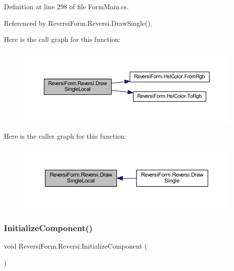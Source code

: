Definition at line 298 of file Form\+Main.\+cs.



Referenced by Reversi\+Form.\+Reversi.\+Draw\+Single().

Here is the call graph for this function\+:
\nopagebreak
\begin{figure}[H]
\begin{center}
\leavevmode
\includegraphics[width=350pt]{class_reversi_form_1_1_reversi_aaa7228857f9476b7950b0af1524abf44_cgraph}
\end{center}
\end{figure}
Here is the caller graph for this function\+:
\nopagebreak
\begin{figure}[H]
\begin{center}
\leavevmode
\includegraphics[width=350pt]{class_reversi_form_1_1_reversi_aaa7228857f9476b7950b0af1524abf44_icgraph}
\end{center}
\end{figure}
\mbox{\label{class_reversi_form_1_1_reversi_abec0816dd006d05b512d86b45a20af68}} 
\subsubsection{\texorpdfstring{Initialize\+Component()}{InitializeComponent()}}
{\footnotesize\ttfamily void Reversi\+Form.\+Reversi.\+Initialize\+Component (\begin{DoxyParamCaption}{ }\end{DoxyParamCaption})\hspace{0.3cm}{\ttfamily [private]}}



